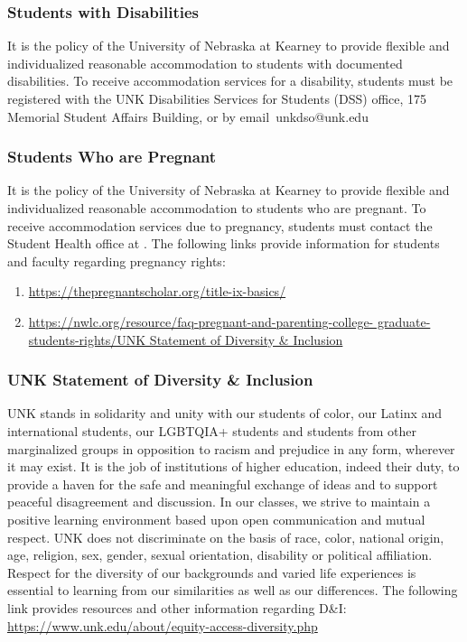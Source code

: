 \documentclass[12pt]{article}
\newcounter{ex}\setcounter{ex}{0}
\begin{document}
\subsubsection*{Students with Disabilities}

It is the policy of the University of Nebraska at Kearney to provide flexible and individualized reasonable accommodation to students with documented disabilities. To receive accommodation services for a disability, students must be registered with the UNK Disabilities Services for Students (DSS) office, 175 Memorial Student Affairs Building,   or by email unkdso@unk.edu  


\subsubsection*{Students Who are Pregnant}

It is the policy of the University of Nebraska at Kearney to provide flexible 
and individualized reasonable accommodation to students who are pregnant. 
To receive accommodation services due to pregnancy, students must contact 
the Student Health office at . The following 
links provide information for students and faculty regarding pregnancy 
rights:
\small
\begin{enumerate}
  \item \url{https://thepregnantscholar.org/title-ix-basics/}
  \item \url{https://nwlc.org/resource/faq-pregnant-and-parenting-college-
  graduate-students-rights/UNK Statement of Diversity & Inclusion}
\end{enumerate}
\normalsize

\subsubsection*{UNK Statement of Diversity \& Inclusion}

UNK stands in solidarity and unity with our students of color, our Latinx and international students, our LGBTQIA+ students 
and students from other marginalized groups in opposition to racism 
and prejudice in any form, wherever it may exist. It is the job of 
institutions of higher education, indeed their duty, to provide a 
haven for the safe and meaningful exchange of ideas and to support 
peaceful disagreement and discussion. In our classes, we strive to 
maintain a positive learning environment based upon open 
communication and mutual respect. UNK does not discriminate on the 
basis of race, color, national origin, age, religion, sex, gender, 
sexual orientation, disability or political affiliation. 
Respect for the diversity of our backgrounds and varied life 
experiences is essential to learning from our similarities as well 
as our differences. The following link provides resources and other 
information regarding D\&I: \url{https://www.unk.edu/about/equity-access-diversity.php}



\end{document}
